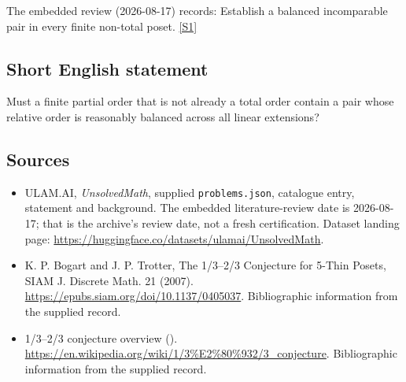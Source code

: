 \documentclass[11pt,a4paper]{article}
\newcommand{\sref}[2]{\hyperlink{source:#1:#2}{[S#2]}}
\begin{document}
The embedded review (2026-08-17) records: Establish a balanced incomparable pair in every finite non-total poset. \sref{statement}{1}

\subsection{Short English statement}

Must a finite partial order that is not already a total order contain a pair whose relative order is reasonably balanced across all linear extensions?

\subsection{Sources}

{\small

\begin{itemize}

\item[\hypertarget{source:statement:1}{S1}] ULAM.AI, \emph{UnsolvedMath}, supplied \texttt{problems.json}, catalogue entry, statement and background. The embedded literature-review date is 2026-08-17; that is the archive’s review date, not a fresh certification. Dataset landing page: \url{https://huggingface.co/datasets/ulamai/UnsolvedMath}.

\item[\hypertarget{source:statement:2}{S2}] K. P. Bogart and J. P. Trotter, The 1/3--2/3 Conjecture for 5-Thin Posets, SIAM J. Discrete Math. 21 (2007). \url{https://epubs.siam.org/doi/10.1137/0405037}. Bibliographic information from the supplied record.

\item[\hypertarget{source:statement:3}{S3}] 1/3--2/3 conjecture overview (). \url{https://en.wikipedia.org/wiki/1/3%E2%80%932/3_conjecture}. Bibliographic information from the supplied record.

\end{itemize}

}

\label{end:statement}
\end{document}
